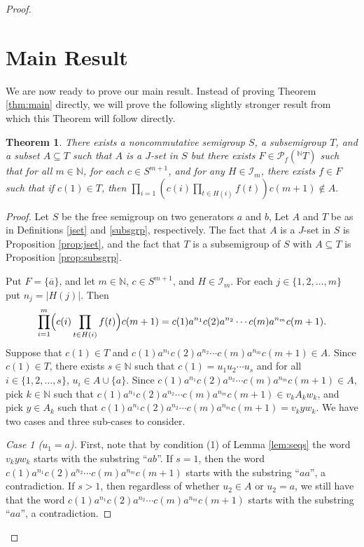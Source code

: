 \documentclass[12pt]{article}
\theoremstyle{plain}
\newtheorem{thm}{Theorem}[section]
\theoremstyle{definition}
\begin{document}
\begin{proof}
\section{Main Result}
We are now ready to prove our main result.
Instead of proving Theorem \ref{thm:main} directly, we will
prove the following slightly stronger result from which this  
Theorem will follow directly.

  \begin{thm}
  There exists a noncommutative semigroup $S$, a subsemigroup
  $T$, and a subset $A \subseteq T$ such that $A$ is a $J$-set
  in $S$ but there exists $F \in \mathcal{P}_f(^{\mathbb{N}}{T})$
  such that for all $m \in \mathbb{N}$, for each $c \in S^{m+1}$,
  and for any $H \in \mathcal{I}_m$, there exists $f \in F$ such
  that if $c(1) \in T$, then $\prod_{i=1}(c(i)\prod_{t \in H(i)} f(t))
  c(m+1) \not\in A.$
  \end{thm}
  \begin{proof}
  Let $S$ be the free semigroup on two generators $a$ and $b$,
  Let $A$ and $T$  be as in Definitions \ref{jset} and 
  \ref{subsgrp}, respectively. 
  The fact that $A$ is a $J$-set in $S$ is Proposition 
  \ref{prop:jset}, and the fact that $T$ is a subsemigroup of $S$
  with $A \subseteq T$ is Proposition \ref{prop:subsgrp}.

  Put $F = \{\overline{a}\}$, and let $m \in \mathbb{N}$, $c \in
  S^{m+1}$, and $H \in \mathcal{I}_m$. 
  For each $j \in \{1, 2, \ldots, m\}$ put $n_j = |H(j)|$. 
  Then
  \[
  \prod_{i=1}^m\Bigl(c(i) \prod_{t \in H(i)} f(t)\Bigr)c(m+1) =
  c(1)a^{n_1}c(2)a^{n_2} \cdots c(m)a^{n_m}c(m+1).
  \]
  Suppose that $c(1) \in T$ and $c(1)a^{n_1}c(2)a^{n_2} \cdots 
  c(m)a^{n_m}c(m+1) \in A$. 
  Since $c(1) \in T$, there exists $s \in \mathbb{N}$ such that
  $c(1) = u_1u_2 \cdots u_s$ and for all $i \in \{1, 2, \ldots, s\}$,
  $u_i \in A \cup \{a\}$. 
  Since $c(1)a^{n_1}c(2)a^{n_2} \cdots c(m)a^{n_m}c(m+1) \in A$, pick
  $k \in \mathbb{N}$ such that $c(1)a^{n_1}c(2)a^{n_2} \cdots 
  c(m)a^{n_m}c(m+1) \in v_kA_kw_k$, and pick $y \in A_k$ such that
  $c(1)a^{n_1}c(2)a^{n_2} \cdots c(m)a^{n_m}c(m+1) = v_kyw_k$. 
  We have two cases and three sub-cases to consider. 
  
  \textsl{Case 1 ($u_1=a$).} 
  First, note that by condition (1) of Lemma \ref{lem:seqs} the
  word $v_kyw_k$ starts with the substring ``$ab$''.
  If $s=1$, then the word $c(1)a^{n_1}c(2) \allowbreak a^{n_2} \cdots 
  c(m) a^{n_m} c(m+1)$ starts with the substring ``$aa$'', a
  contradiction.
  If $s>1$, then regardless of whether $u_2 \in A$ or $u_2 = a$,
  we still have that the word $c(1)a^{n_1}c(2) \allowbreak a^{n_2}
  \cdots c(m) a^{n_m} c(m+1)$ starts with the substring ``$aa$'',
  a contradiction.


\end{proof}
\end{proof}
\end{document}
